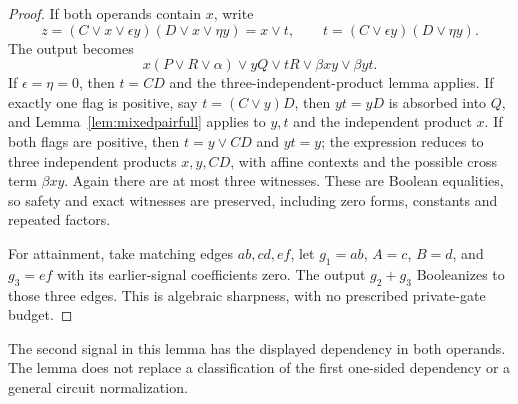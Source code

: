 \documentclass[11pt]{article}
\theoremstyle{definition}
\theoremstyle{remark}
\begin{document}
\begin{proof}
If both operands contain $x$, write
\[
 z=(C\vee x\vee\epsilon y)(D\vee x\vee\eta y)=x\vee t,
 \qquad t=(C\vee\epsilon y)(D\vee\eta y).
\]
The output becomes
\[
 x(P\vee R\vee\alpha)\vee yQ\vee tR
       \vee\beta xy\vee\beta yt.
\]
If $\epsilon=\eta=0$, then $t=CD$ and the three-independent-product lemma applies. If exactly one flag is positive, say $t=(C\vee y)D$, then $yt=yD$ is absorbed into $Q$, and Lemma~\ref{lem:mixedpairfull} applies to $y,t$ and the independent product $x$. If both flags are positive, then $t=y\vee CD$ and $yt=y$; the expression reduces to three independent products $x,y,CD$, with affine contexts and the possible cross term $\beta xy$. Again there are at most three witnesses. These are Boolean equalities, so safety and exact witnesses are preserved, including zero forms, constants and repeated factors.

For attainment, take matching edges $ab,cd,ef$, let $g_1=ab$, $A=c$, $B=d$, and $g_3=ef$ with its earlier-signal coefficients zero. The output $g_2+g_3$ Booleanizes to those three edges. This is algebraic sharpness, with no prescribed private-gate budget.
\end{proof}

The second signal in this lemma has the displayed dependency in both operands. The lemma does not replace a classification of the first one-sided dependency or a general circuit normalization.
\end{document}
